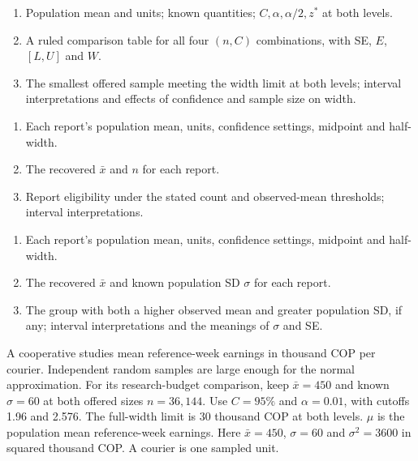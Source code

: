 \begin{enumerate}[label=\arabic*.,itemsep=2pt]
\item Population mean and units; known quantities; $C,\alpha,\alpha/2,z^*$ at both levels.
\item A ruled comparison table for all four $(n,C)$ combinations, with SE, $E$, $[L,U]$ and $W$.
\item The smallest offered sample meeting the width limit at both levels; interval interpretations and effects of confidence and sample size on width.
\end{enumerate}
\begin{enumerate}[label=\arabic*.,itemsep=2pt]
\item Each report's population mean, units, confidence settings, midpoint and half-width.
\item The recovered $\bar x$ and $n$ for each report.
\item Report eligibility under the stated count and observed-mean thresholds; interval interpretations.
\end{enumerate}
\begin{enumerate}[label=\arabic*.,itemsep=2pt]
\item Each report's population mean, units, confidence settings, midpoint and half-width.
\item The recovered $\bar x$ and known population SD $\sigma$ for each report.
\item The group with both a higher observed mean and greater population SD, if any; interval interpretations and the meanings of $\sigma$ and SE.
\end{enumerate}
A cooperative studies mean reference-week earnings in thousand COP per courier. Independent random samples are large enough for the normal approximation. For its research-budget comparison, keep $\bar x=450$ and known $\sigma=60$ at both offered sizes $n=36,144$. Use $C=95\%$ and $\alpha=0.01$, with cutoffs 1.96 and 2.576. The full-width limit is 30 thousand COP at both levels.
$\mu$ is the population mean reference-week earnings. Here $\bar x=450$, $\sigma=60$ and $\sigma^2=3600$ in squared thousand COP. A courier is one sampled unit.
